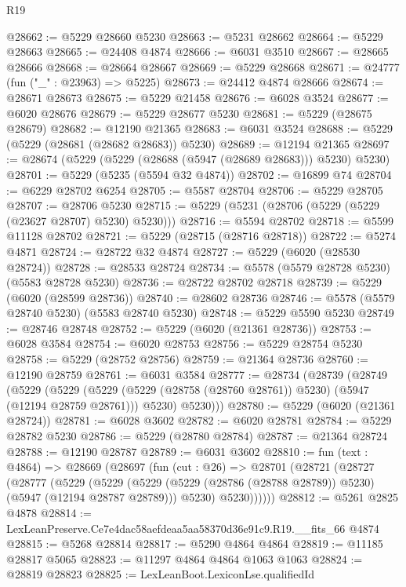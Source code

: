 \begin{lexlean}{R19}
\begin{coremodule}
@28662 := @5229 @28660 @5230
@28663 := @5231 @28662
@28664 := @5229 @28663
@28665 := @24408 @4874
@28666 := @6031 @3510
@28667 := @28665 @28666
@28668 := @28664 @28667
@28669 := @5229 @28668
@28671 := @24777 (fun ("_" : @23963) => @5225)
@28673 := @24412 @4874 @28666
@28674 := @28671 @28673
@28675 := @5229 @21458
@28676 := @6028 @3524
@28677 := @6020 @28676
@28679 := @5229 @28677 @5230
@28681 := @5229 (@28675 @28679)
@28682 := @12190 @21365
@28683 := @6031 @3524
@28688 := @5229 (@5229 (@28681 (@28682 @28683)) @5230)
@28689 := @12194 @21365
@28697 := @28674 (@5229 (@5229 (@28688 (@5947 (@28689 @28683))) @5230) @5230)
@28701 := @5229 (@5235 (@5594 @32 @4874))
@28702 := @16899 @74
@28704 := @6229 @28702 @6254
@28705 := @5587 @28704
@28706 := @5229 @28705
@28707 := @28706 @5230
@28715 := @5229 (@5231 (@28706 (@5229 (@5229 (@23627 @28707) @5230) @5230)))
@28716 := @5594 @28702
@28718 := @5599 @11128 @28702
@28721 := @5229 (@28715 (@28716 @28718))
@28722 := @5274 @4871
@28724 := @28722 @32 @4874
@28727 := @5229 (@6020 (@28530 @28724))
@28728 := @28533 @28724
@28734 := @5578 (@5579 @28728 @5230) (@5583 @28728 @5230)
@28736 := @28722 @28702 @28718
@28739 := @5229 (@6020 (@28599 @28736))
@28740 := @28602 @28736
@28746 := @5578 (@5579 @28740 @5230) (@5583 @28740 @5230)
@28748 := @5229 @5590 @5230
@28749 := @28746 @28748
@28752 := @5229 (@6020 (@21361 @28736))
@28753 := @6028 @3584
@28754 := @6020 @28753
@28756 := @5229 @28754 @5230
@28758 := @5229 (@28752 @28756)
@28759 := @21364 @28736
@28760 := @12190 @28759
@28761 := @6031 @3584
@28777 := @28734
    (@28739
      (@28749
        (@5229
          (@5229
            (@5229 (@5229 (@28758 (@28760 @28761)) @5230) (@5947 (@12194 @28759 @28761)))
            @5230)
          @5230)))
@28780 := @5229 (@6020 (@21361 @28724))
@28781 := @6028 @3602
@28782 := @6020 @28781
@28784 := @5229 @28782 @5230
@28786 := @5229 (@28780 @28784)
@28787 := @21364 @28724
@28788 := @12190 @28787
@28789 := @6031 @3602
@28810 := fun (text : @4864) =>
  @28669
    (@28697
      (fun (cut : @26) =>
      @28701
        (@28721
          (@28727
            (@28777
              (@5229
                (@5229
                  (@5229 (@5229 (@28786 (@28788 @28789)) @5230) (@5947 (@12194 @28787 @28789)))
                  @5230)
                @5230))))))
@28812 := @5261 @2825 @4878
@28814 := LexLeanPreserve.Ce7e4dac58aefdeaa5aa58370d36e91c9.R19.__fits_66 @4874
@28815 := @5268 @28814
@28817 := @5290 @4864 @4864
@28819 := @11185 @28817 @5065
@28823 := @11297 @4864 @4864 @1063 @1063
@28824 := @28819 @28823
@28825 := LexLeanBoot.LexiconLse.qualifiedId

\end{coremodule}
\end{lexlean}
